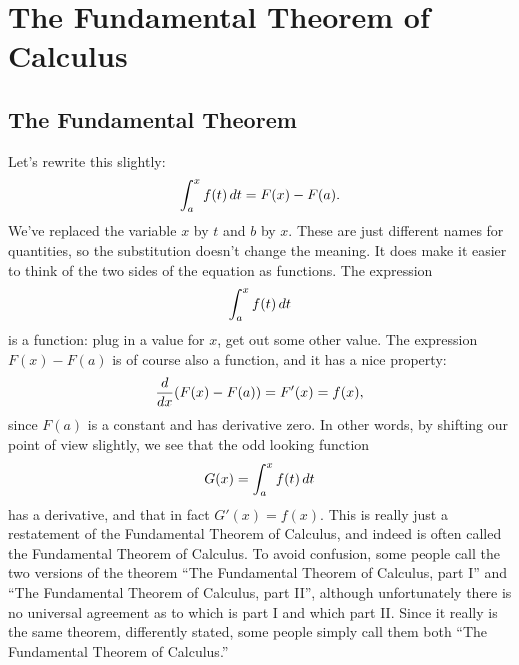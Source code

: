 \chapter{The Fundamental Theorem of Calculus}

\section{The Fundamental Theorem}



Let's rewrite this slightly: 
\[
  \int_a^x f(t)\, d t = F(x)-F(a).
\]
We've replaced the variable $x$ by $t$ and $b$ by $x$. These are just
different names for quantities, so the substitution doesn't change the
meaning. It does make it easier to think of the two sides of the
equation as functions. The expression
\[
  \int_a^x f(t)\, d t
\]
is a function: plug in a value for $x$, get out some other value. The
expression $F(x)-F(a)$ is of course also a function, and it has a nice
property: 
\[
\frac{d}{dx} (F(x)-F(a)) = F'(x) = f(x),
\]
since $F(a)$ is a constant and has derivative zero. In other words, by
shifting our point of view slightly, we see that the odd looking
function
\[
  G(x)=\int_a^x f(t)\, d t
\]
has a derivative, and that in fact $G'(x)=f(x)$. This is really just a
restatement of the Fundamental Theorem of Calculus, and indeed is
often called the Fundamental Theorem of Calculus. To avoid confusion,
some people call the two versions of the theorem ``The Fundamental
Theorem of Calculus, part I'' and ``The Fundamental
Theorem of Calculus, part II'', although unfortunately there is no
universal agreement as to which is part I and which part II. Since it
really is the same theorem, differently stated, some people simply
call them both ``The Fundamental
Theorem of Calculus.''

